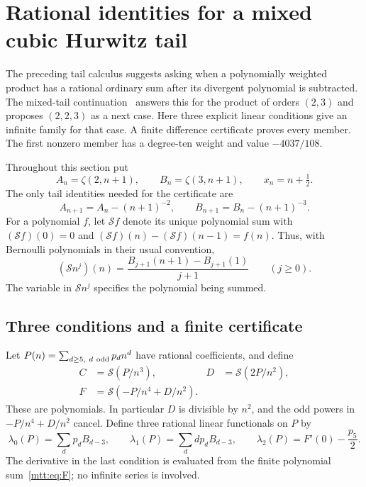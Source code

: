 \section{Rational identities for a mixed cubic Hurwitz tail}
\label{mtt:section}
The preceding tail calculus suggests asking when a polynomially weighted
product has a rational ordinary sum after its divergent polynomial is
subtracted. The mixed-tail continuation~\cite{mtt:report} answers this
for the product of orders $(2,3)$ and proposes $(2,2,3)$ as a next case.
Here three explicit linear conditions give an infinite family for that
case. A finite difference certificate proves every member. The first
nonzero member has a degree-ten weight and value $-4037/108$.

Throughout this section put
\[
 A_n=\zeta(2,n+1),\qquad B_n=\zeta(3,n+1),\qquad x_n=n+\tfrac12.
\]
The only tail identities needed for the certificate are
\begin{equation}\label{mtt:eq:shifts}
 A_{n+1}=A_n-(n+1)^{-2},\qquad
 B_{n+1}=B_n-(n+1)^{-3}.
\end{equation}
For a polynomial $f$, let $\mathcal S f$ denote its unique polynomial
sum with $(\mathcal S f)(0)=0$ and
$(\mathcal S f)(n)-(\mathcal S f)(n-1)=f(n)$.
Thus, with Bernoulli polynomials in their usual convention,
\begin{equation}\label{mtt:eq:power-sum}
 (\mathcal S n^j)(n)
 =\frac{B_{j+1}(n+1)-B_{j+1}(1)}{j+1}\qquad(j\ge0).
\end{equation}
The variable in $\mathcal S n^j$ specifies the polynomial being summed.

\subsection{Three conditions and a finite certificate}
Let $P(n)=\sum_{d\ge5,\ d\ {\rm odd}}p_dn^d$ have rational coefficients,
and define
\begin{align}
 C&=\mathcal S(P/n^3),&
 D&=\mathcal S(2P/n^2),\label{mtt:eq:CD}\\
 F&=\mathcal S(-P/n^4+D/n^2).\label{mtt:eq:F}
\end{align}
These are polynomials. In particular $D$ is divisible by $n^2$, and the
odd powers in $-P/n^4+D/n^2$ cancel. Define three rational linear
functionals on $P$ by
\begin{equation}\label{mtt:eq:conditions}
 \lambda_0(P)=\sum_dp_dB_{d-3},\qquad
 \lambda_1(P)=\sum_ddp_dB_{d-3},\qquad
 \lambda_2(P)=F'(0)-\frac{p_5}{2}.
\end{equation}
The derivative in the last condition is evaluated from the finite
polynomial sum~\eqref{mtt:eq:F}; no infinite series is involved.

